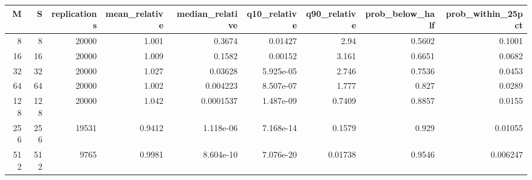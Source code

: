 \begin{tabular}{rrrrrrrrr}
\toprule
M & S & replications & mean_relative & median_relative & q10_relative & q90_relative & prob_below_half & prob_within_25pct \\
\midrule
8 & 8 & 20000 & 1.001 & 0.3674 & 0.01427 & 2.94 & 0.5602 & 0.1001 \\
16 & 16 & 20000 & 1.009 & 0.1582 & 0.00152 & 3.161 & 0.6651 & 0.0682 \\
32 & 32 & 20000 & 1.027 & 0.03628 & 5.925e-05 & 2.746 & 0.7536 & 0.0453 \\
64 & 64 & 20000 & 1.002 & 0.004223 & 8.507e-07 & 1.777 & 0.827 & 0.0289 \\
128 & 128 & 20000 & 1.042 & 0.0001537 & 1.487e-09 & 0.7409 & 0.8857 & 0.0155 \\
256 & 256 & 19531 & 0.9412 & 1.118e-06 & 7.168e-14 & 0.1579 & 0.929 & 0.01055 \\
512 & 512 & 9765 & 0.9981 & 8.604e-10 & 7.076e-20 & 0.01738 & 0.9546 & 0.006247 \\
\bottomrule
\end{tabular}
